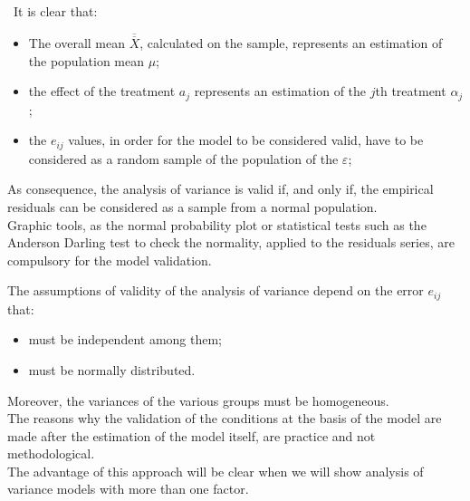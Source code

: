\begin{frame}
  \begin{small}
    \vspace*{.25cm} 
    \ It is clear that:
    \begin{itemize}
      \item The overall mean {\boldmath $ \overline{\overline{X}} $}, calculated on the sample, represents an estimation of the population mean {\boldmath $ \mu $};
      \item the effect of the treatment $a_j$ represents an estimation of the $ j $th treatment {\boldmath $ \alpha_j $};
      \item the {\boldmath $ e_{ij} $} values, in order for the model to be considered valid, have to be considered as a random sample of the population of the $\varepsilon$;
    \end{itemize}
    As consequence, the analysis of variance is valid if, and only if, the empirical residuals can be considered as a sample from a normal population. \\
    Graphic tools, as the normal probability plot or statistical tests such as the Anderson Darling test to check the normality, applied to the residuals series, are compulsory for the model validation.
  \end{small}
\end{frame}

\begin{frame}
  \vspace*{.25cm} 
  The assumptions of validity of the analysis of variance depend on the error {\boldmath$e_{ij}$} that:
  \begin{itemize}
    \item must be independent among them;
    \item must be normally distributed.
  \end{itemize}
  \vspace*{.25cm}
  Moreover, the variances of the various groups must be homogeneous. \\
  \vspace*{.5cm}
  The reasons why the validation of the conditions at the basis of the model are made after the estimation of the model itself, are practice and not methodological.\\
  \vspace*{.5cm}
  The advantage of this approach will be clear when we will show analysis of variance models with more than one factor.
\end{frame}

